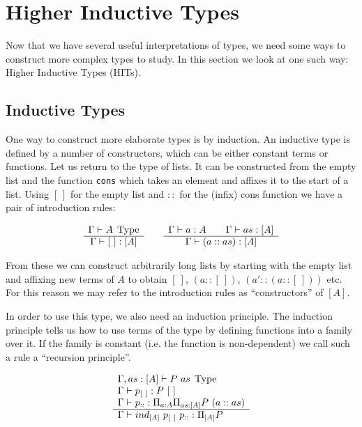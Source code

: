 \section{Higher Inductive Types}\label{sec:HITs}

Now that we have several useful interpretations of types, we need some ways to
construct more complex types to study. In this section we look at one such way:
Higher Inductive Types (HITs).

\subsection{Inductive Types}
One way to construct more elaborate types is by induction. An inductive type is
defined by a number of constructors, which can be either constant terms or
functions. Let us return to the type of lists. It can be constructed from the
empty list and the function \texttt{cons} which takes an element and affixes it
to the start of a list. Using $[~]$ for the empty list and $::$ for the (infix)
cons function we have a pair of introduction rules:

\[
  \begin{array}[t]{c}
    \Gamma \vdash A \; \operatorname{Type}\\
    \hline
    \Gamma \vdash [~] : [A]\\
  \end{array}
  \qquad
  \begin{array}[t]{c}
    \Gamma \vdash a:A \qquad \Gamma \vdash as:[A] \\
    \hline
    \Gamma \vdash ( a :: as ) : [A]
  \end{array}
\]

From these we can construct arbitrarily long lists by starting with the empty
list and affixing new terms of $A$ to obtain $[~]$, $(a::[~])$, $(a'::(a::[~]))$
etc. For this reason we may refer to the introduction rules as ``constructors''
of $[A]$.

In order to use this type, we also need an induction principle. The
induction principle tells us how to use terms of the type by defining functions
into a family over it. If the family is constant (i.e. the function is
non-dependent) we call such a rule a ``recursion principle''.

\[
  \begin{array}{l}
    \Gamma, as : [A] \vdash P~as \; \operatorname{Type}\\
    \Gamma \vdash p_{[~]} : P~[~]\\
    \Gamma \vdash p_{::}: \Pi_{a:A} \Pi_{as:[A]} P~(a :: as)\\
    \hline
    \Gamma \vdash ind_{[A]}~p_{[~]}~p_{::} : \Pi_{[A]} P
  \end{array}
\]

